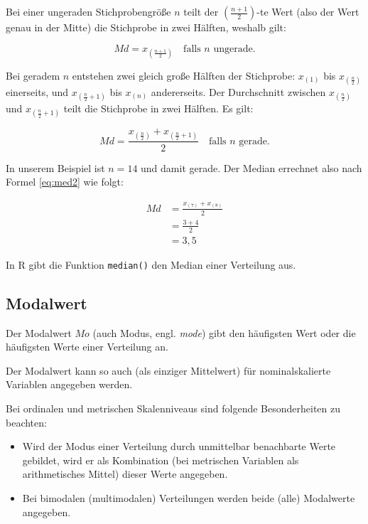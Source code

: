 \documentclass[
  11pt,
  ngerman,
  a4paper,
]{report}
\providecommand{\tightlist}{%
  \setlength{\itemsep}{0pt}\setlength{\parskip}{0pt}}
\newenvironment{rtip}{
  \medskip
  \begin{tcolorbox}[colframe=purple,colback=light_gray,title=Softwarehinweis]
}{
  \end{tcolorbox}
  \medskip
}
\begin{document}
Bei einer ungeraden Stichprobengröße \(n\) teilt der \((\frac{n+1}{2})\)-te Wert (also der Wert genau in der Mitte) die Stichprobe in zwei Hälften, weshalb gilt:

\[
  \mathit{Md} = x_{(\frac{n+1}{2})} \quad \text{falls }n\text{ ungerade.}
  \label{eq:med1}
\]

Bei geradem \(n\) entstehen zwei gleich große Hälften der Stichprobe: \(x_{(1)}\) bis \(x_{(\frac{n}{2})}\) einerseits, und \(x_{(\frac{n}{2}+1)}\) bis \(x_{(n)}\) andererseits. Der Durchschnitt zwischen \(x_{(\frac{n}{2})}\) und \(x_{(\frac{n}{2}+1)}\) teilt die Stichprobe in zwei Hälften. Es gilt:

\[
  \mathit{Md} = \frac{x_{(\frac{n}{2})} + x_{(\frac{n}{2}+1)}}{2} \quad \text{falls } n \text{ gerade.}
  \label{eq:med2}
\]

In unserem Beispiel ist \(n=14\) und damit gerade. Der Median errechnet also nach Formel \eqref{eq:med2} wie folgt:

\[
  \begin{aligned}
    \mathit{Md} & = \frac{x_{(7)} + x_{(8)}}{2} \\[4pt]
                & = \frac{3 + 4}{2} \\[4pt]
                & = 3{,}5
  \end{aligned}
\]

\begin{rtip}
In R gibt die Funktion \verb|median()| den Median einer Verteilung aus.
\end{rtip}

\hypertarget{modalwert}{%
\subsection{Modalwert}\label{modalwert}}

Der Modalwert \(\mathit{Mo}\) (auch Modus, engl. \emph{mode}) gibt den häufigsten Wert oder die häufigsten Werte einer Verteilung an.

Der Modalwert kann so auch (als einziger Mittelwert) für nominalskalierte Variablen angegeben werden.

Bei ordinalen und metrischen Skalenniveaus sind folgende Besonderheiten zu beachten:

\begin{itemize}
\tightlist
\item
  Wird der Modus einer Verteilung durch unmittelbar benachbarte Werte gebildet, wird er als Kombination (bei metrischen Variablen als arithmetisches Mittel) dieser Werte angegeben.
\item
  Bei bimodalen (multimodalen) Verteilungen werden beide (alle) Modalwerte angegeben.
\end{itemize}
\end{document}

